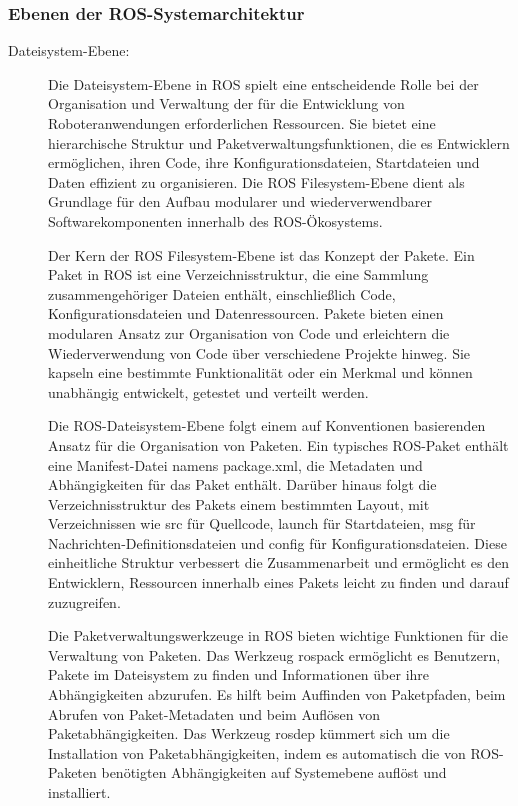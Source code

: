 \subsubsection{Ebenen der ROS-Systemarchitektur} \label{ebenen_ros_systemarchitektur:subsubsection}
\begin{description}
    \item[Dateisystem-Ebene:] Die Dateisystem-Ebene in \ac{ROS} spielt eine entscheidende Rolle bei der Organisation und Verwaltung der für die Entwicklung von Roboteranwendungen erforderlichen Ressourcen. Sie bietet eine hierarchische Struktur und Paketverwaltungsfunktionen, die es Entwicklern ermöglichen, ihren Code, ihre Konfigurationsdateien, Startdateien und Daten effizient zu organisieren. Die \ac{ROS} Filesystem-Ebene dient als Grundlage für den Aufbau modularer und wiederverwendbarer Softwarekomponenten innerhalb des \ac{ROS}-Ökosystems.

    Der Kern der \ac{ROS} Filesystem-Ebene ist das Konzept der Pakete. Ein Paket in \ac{ROS} ist eine Verzeichnisstruktur, die eine Sammlung zusammengehöriger Dateien enthält, einschließlich Code, Konfigurationsdateien und Datenressourcen. Pakete bieten einen modularen Ansatz zur Organisation von Code und erleichtern die Wiederverwendung von Code über verschiedene Projekte hinweg. Sie kapseln eine bestimmte Funktionalität oder ein Merkmal und können unabhängig entwickelt, getestet und verteilt werden.
    
    Die \ac{ROS}-Dateisystem-Ebene folgt einem auf Konventionen basierenden Ansatz für die Organisation von Paketen. Ein typisches \ac{ROS}-Paket enthält eine Manifest-Datei namens package.xml, die Metadaten und Abhängigkeiten für das Paket enthält. Darüber hinaus folgt die Verzeichnisstruktur des Pakets einem bestimmten Layout, mit Verzeichnissen wie src für Quellcode, launch für Startdateien, msg für Nachrichten-Definitionsdateien und config für Konfigurationsdateien. Diese einheitliche Struktur verbessert die Zusammenarbeit und ermöglicht es den Entwicklern, Ressourcen innerhalb eines Pakets leicht zu finden und darauf zuzugreifen. \cite[vgl.][]{ros-Packages}
    
    Die Paketverwaltungswerkzeuge in \ac{ROS} bieten wichtige Funktionen für die Verwaltung von Paketen. Das Werkzeug rospack ermöglicht es Benutzern, Pakete im Dateisystem zu finden und Informationen über ihre Abhängigkeiten abzurufen. Es hilft beim Auffinden von Paketpfaden, beim Abrufen von Paket-Metadaten und beim Auflösen von Paketabhängigkeiten. Das Werkzeug rosdep kümmert sich um die Installation von Paketabhängigkeiten, indem es automatisch die von \ac{ROS}-Paketen benötigten Abhängigkeiten auf Systemebene auflöst und installiert.
    

\end{description}
